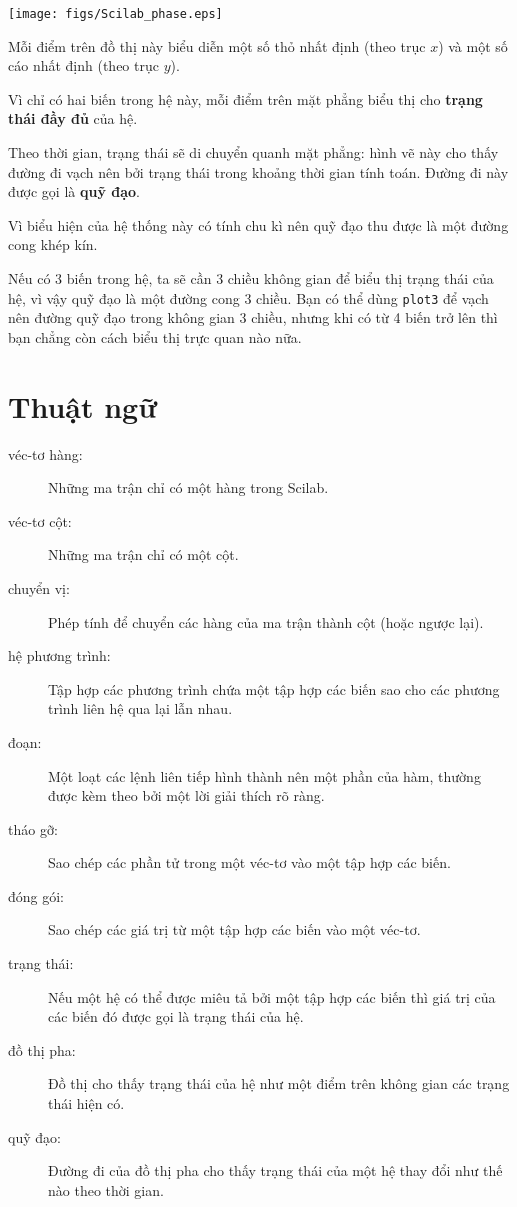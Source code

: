 \documentclass[12pt]{book}
\begin{document}
\centerline{\texttt{[image: figs/Scilab\_phase.eps]}}

Mỗi điểm trên đồ thị này biểu diễn một số thỏ nhất định (theo trục $x$)
và một số cáo nhất định (theo trục $y$).

Vì chỉ có hai biến trong hệ này, mỗi điểm trên mặt phẳng biểu thị
cho {\bf trạng thái đầy đủ} của hệ.

Theo thời gian, trạng thái sẽ di chuyển quanh mặt phẳng: hình vẽ
này cho thấy đường đi vạch nên bởi trạng thái trong khoảng thời
gian tính toán. Đường đi này được gọi là {\bf quỹ đạo}.

Vì biểu hiện của hệ thống này có tính chu kì nên quỹ đạo thu được
là một đường cong khép kín.

Nếu có 3 biến trong hệ, ta sẽ cần 3 chiều không gian để biểu thị
trạng thái của hệ, vì vậy quỹ đạo là một đường cong 3 chiều. Bạn
có thể dùng {\tt plot3} để vạch nên đường quỹ đạo trong không gian
3 chiều, nhưng khi có từ 4 biến trở lên thì bạn chẳng còn cách
biểu thị trực quan nào nữa.


\section{Thuật ngữ}

\begin{description}

\item[véc-tơ hàng:] Những ma trận chỉ có một hàng trong Scilab.

\item[véc-tơ cột:] Những ma trận chỉ có một cột. 

\item[chuyển vị:] Phép tính để chuyển các hàng của ma trận thành
cột (hoặc ngược lại).

\item[hệ phương trình:] Tập hợp các phương trình chứa một tập hợp
các biến sao cho các phương trình liên hệ qua lại lẫn nhau.

\item[đoạn:] Một loạt các lệnh liên tiếp hình thành nên một phần của
hàm, thường được kèm theo bởi một lời giải thích rõ ràng.

\item[tháo gỡ:] Sao chép các phần tử trong một véc-tơ vào một 
tập hợp các biến.

\item[đóng gói:] Sao chép các giá trị từ một tập hợp các biến vào
một véc-tơ.

\item[trạng thái:] Nếu một hệ có thể được miêu tả bởi một tập hợp 
các biến thì giá trị của các biến đó được gọi là trạng thái của hệ.

\item[đồ thị pha:] Đồ thị cho thấy trạng thái của hệ như một điểm
trên không gian các trạng thái hiện có.

\item[quỹ đạo:] Đường đi của đồ thị pha cho thấy trạng thái của
một hệ thay đổi như thế nào theo thời gian.


\end{description}
\end{document}
